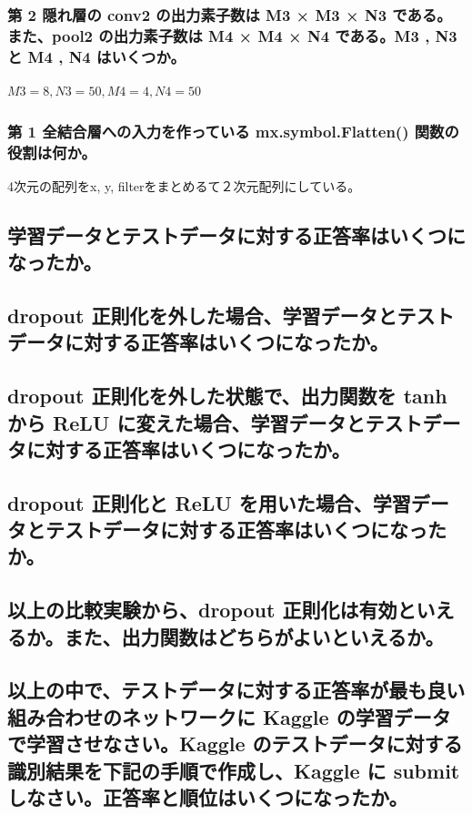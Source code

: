\documentclass{ltjsarticle}
\begin{document}
\subsubsection{第 2 隠れ層の conv2 の出力素子数は M3 × M3 × N3 である。また、pool2 の出力素子数は M4 × M4 × N4 である。M3 , N3 と M4 , N4 はいくつか。}
$M3=8,N3=50,M4=4,N4=50$

\subsubsection{第 1 全結合層への入力を作っている mx.symbol.Flatten() 関数の役割は何か。}
4次元の配列をx, y, filterをまとめるて２次元配列にしている。
\subsection{学習データとテストデータに対する正答率はいくつになったか。}

\subsection{dropout 正則化を外した場合、学習データとテストデータに対する正答率はいくつになったか。}

\subsection{dropout 正則化を外した状態で、出力関数を tanh から ReLU に変えた場合、学習データとテストデータに対する正答率はいくつになったか。}

\subsection{dropout 正則化と ReLU を用いた場合、学習データとテストデータに対する正答率はいくつになったか。}

\subsection{以上の比較実験から、dropout 正則化は有効といえるか。また、出力関数はどちらがよいといえるか。}

\subsection{以上の中で、テストデータに対する正答率が最も良い組み合わせのネットワークに Kaggle の学習データで学習させなさい。Kaggle のテストデータに対する識別結果を下記の手順で作成し、Kaggle に submit しなさい。正答率と順位はいくつになったか。}
\end{document}

